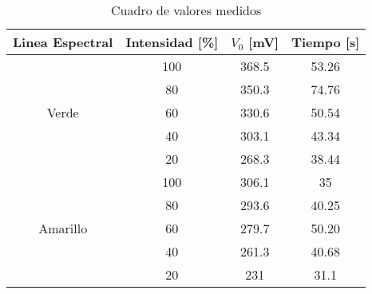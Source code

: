 \documentclass[a4paper,12pt]{report}
\begin{document}
    \begin{table}[htbp!]
        \centering
        \begin{tabular}{|c|c|c|c|}
        \hline
        Linea Espectral & Intensidad [\%] & $V_0$ [mV]& Tiempo [s]\\
        \hline
        \multirow{5}{*}{Verde} & 100 & 368.5 & 53.26 \\
                                \cline{2-4}
                                &  80 & 350.3 & 74.76 \\
                                \cline{2-4}
                                &  60 & 330.6 & 50.54 \\
                                \cline{2-4}
                                &  40 & 303.1 & 43.34 \\
                                \cline{2-4}
                                &  20 & 268.3 & 38.44 \\
        \hline
        \multirow{5}{*}{Amarillo} & 100 & 306.1 & 35 \\
                                \cline{2-4}
                                  &  80 & 293.6 & 40.25 \\
                                \cline{2-4}
                                  &  60 & 279.7 & 50.20 \\
                                \cline{2-4}
                                  &  40 & 261.3 & 40.68 \\
                                \cline{2-4}
                                  &  20 & 231 & 31.1 \\
        \hline
        \end{tabular}
        \caption{Cuadro de valores medidos}
        \label{tab:datos experiencia 1}
    \end{table}
\end{document}
